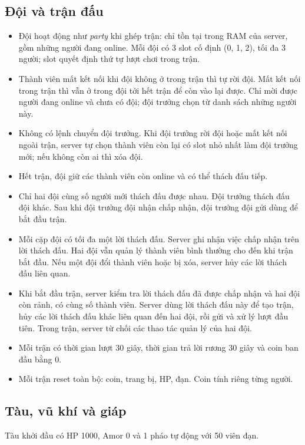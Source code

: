 \documentclass[12pt,a4paper]{article}
\newcommand{\cmd}[1]{\texttt{\seqsplit{#1}}}
\begin{document}
\subsection{Đội và trận đấu}
\begin{itemize}
  \item Đội hoạt động như \emph{party} khi ghép trận: chỉ tồn tại trong RAM của server, gồm những người đang online. Mỗi đội có 3 slot cố định (0, 1, 2), tối đa 3 người; slot quyết định thứ tự lượt chơi trong trận.
  \item Thành viên mất kết nối khi đội không ở trong trận thì tự rời đội. Mất kết nối trong trận thì vẫn ở trong đội tới hết trận để còn vào lại được. Chỉ mời được người đang online và chưa có đội; đội trưởng chọn từ danh sách những người này.
  \item Không có lệnh chuyển đội trưởng. Khi đội trưởng rời đội hoặc mất kết nối ngoài trận, server tự chọn thành viên còn lại có slot nhỏ nhất làm đội trưởng mới; nếu không còn ai thì xóa đội.
  \item Hết trận, đội giữ các thành viên còn online và có thể thách đấu tiếp.
  \item Chỉ hai đội cùng số người mới thách đấu được nhau. Đội trưởng thách đấu đội khác. Sau khi đội trưởng đội nhận chấp nhận, đội trưởng đội gửi dùng \cmd{CHALLENGE\_START} để bắt đầu trận.
  \item Mỗi cặp đội có tối đa một lời thách đấu. Server ghi nhận việc chấp nhận trên lời thách đấu. Hai đội vẫn quản lý thành viên bình thường cho đến khi trận bắt đầu. Nếu một đội đổi thành viên hoặc bị xóa, server hủy các lời thách đấu liên quan.
  \item Khi bắt đầu trận, server kiểm tra lời thách đấu đã được chấp nhận và hai đội còn rảnh, có cùng số thành viên. Server dùng lời thách đấu này để tạo trận, hủy các lời thách đấu khác liên quan đến hai đội, rồi gửi \cmd{MATCH\_START} và xử lý lượt đầu tiên. Trong trận, server từ chối các thao tác quản lý của hai đội.
  \item Mỗi trận có thời gian lượt 30 giây, thời gian trả lời rương 30 giây và coin ban đầu bằng 0.
  \item Mỗi trận reset toàn bộ: coin, trang bị, HP, đạn. Coin tính riêng từng người.
\end{itemize}

\subsection{Tàu, vũ khí và giáp}
Tàu khởi đầu có HP 1000, Amor 0 và 1 pháo tự động với 50 viên đạn.
\end{document}
